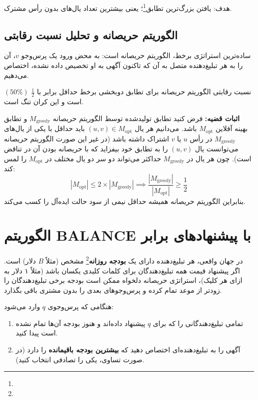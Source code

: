 هدف: یافتن بزرگ‌ترین تطابق\footnote{}؛ یعنی بیشترین تعداد یال‌های بدون رأس مشترک.

\subsection{الگوریتم حریصانه \texorpdfstring{}{(Greedy Algorithm)} و تحلیل نسبت رقابتی}
ساده‌ترین استراتژی برخط، الگوریتم حریصانه است: به محض ورود یک پرس‌وجو $v$، آن را به هر تبلیغ‌دهنده متصل به آن که تاکنون آگهی به او تخصیص داده نشده، اختصاص می‌دهیم.

\begin{theorem}
نسبت رقابتی الگوریتم حریصانه برای تطابق دوبخشی برخط حداقل برابر با $\frac{1}{2}$ $(50\%)$ است و این کران تنگ است.
\end{theorem}

\textbf{اثبات قضیه:}
فرض کنید تطابق تولیدشده توسط الگوریتم حریصانه $M_{\text{greedy}}$ و تطابق بهینه آفلاین $M_{\text{opt}}$ باشد.
می‌دانیم هر یال $(u, v) \in M_{\text{opt}}$ باید حداقل با یکی از یال‌های $M_{\text{greedy}}$ در رأس $u$ یا $v$ اشتراک داشته باشد (در غیر این صورت الگوریتم حریصانه می‌توانست یال $(u, v)$ را به تطابق خود بیفزاید که با حریصانه بودن آن در تناقض است).
چون هر یال در $M_{\text{greedy}}$ حداکثر می‌تواند دو سر دو یال مختلف در $M_{\text{opt}}$ را لمس کند:
\begin{equation}
|M_{\text{opt}}| \le 2 \times |M_{\text{greedy}}| \implies \frac{|M_{\text{greedy}}|}{|M_{\text{opt}}|} \ge \frac{1}{2}
\end{equation}
بنابراین الگوریتم حریصانه همیشه حداقل نیمی از سود حالت ایده‌آل را کسب می‌کند.

\section{الگوریتم BALANCE با پیشنهادهای برابر}
در جهان واقعی، هر تبلیغ‌دهنده دارای یک \textbf{بودجه روزانه}\footnote{} مشخص (مثلاً $B$ دلار) است. اگر پیشنهاد قیمت همه تبلیغ‌دهندگان برای کلمات کلیدی یکسان باشد (مثلاً ۱ دلار به ازای هر کلیک)، استراتژی حریصانه دلخواه ممکن است بودجه برخی تبلیغ‌دهندگان را زودتر از موعد تمام کرده و پرس‌وجوهای بعدی را بدون مشتری باقی بگذارد.

\begin{algorithmbox}
هنگامی که پرس‌وجوی $q$ وارد می‌شود:
\begin{enumerate}
    \item تمامی تبلیغ‌دهندگانی را که برای $q$ پیشنهاد داده‌اند و هنوز بودجه آن‌ها تمام نشده است پیدا کنید.
    \item آگهی را به تبلیغ‌دهنده‌ای اختصاص دهید که \textbf{بیشترین بودجه باقیمانده} را دارد (در صورت تساوی، یکی را تصادفی انتخاب کنید).
\end{enumerate}
\end{algorithmbox}

